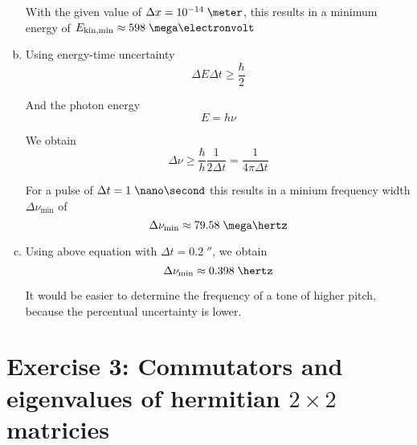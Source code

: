 \documentclass[a4paper,german,12pt,smallheadings]{scrartcl}
\begin{document}
\begin{enumerate}[a)]
    With the given value of $\Delta x = 10^{-14} \; \meter$, this results in a
    minimum energy of $E_\text{kin,min} \approx 598 \; \mega\electronvolt$

  \item
    Using energy-time uncertainty
    \begin{equation*}
      \Delta E \Delta t \ge \frac{\hbar}{2}
    \end{equation*}

    And the photon energy
    \begin{equation*}
      E = h \nu
    \end{equation*}

    We obtain
    \begin{equation*}
      \Delta \nu \ge \frac{\hbar}{h} \frac{1}{2 \Delta t} = \frac{1}{4 \pi \Delta t}
    \end{equation*}

    For a pulse of $\Delta t = 1 \; \nano\second$ this results in a minium frequency width $\Delta \nu_\text{min}$ of
    \begin{equation*}
      \Delta \nu_\text{min} \approx 79.58 \; \mega\hertz
    \end{equation*}
  \item
    Using above equation with $\Delta t = 0.2 \; \second$, we obtain
    \begin{equation*}
      \Delta \nu_\text{min} \approx 0.398 \; \hertz
    \end{equation*}

    It would be easier to determine the frequency of a tone of higher pitch,
    because the percentual uncertainty is lower.
\end{enumerate}
\section*{Exercise 3: Commutators and eigenvalues of hermitian $2 \times 2$ matricies}
\end{document}
